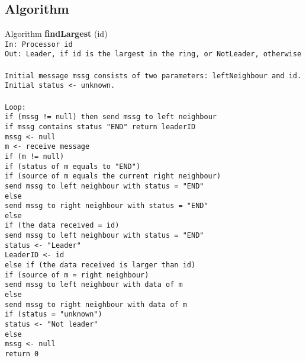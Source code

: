 \documentclass[12pt,letterpaper]{article}
\begin{document}
\subsection* {Algorithm}
Algorithm \textbf{findLargest} (id)\\
\texttt {In: Processor id\\
\texttt Out: Leader, if id is the largest in the ring, or NotLeader, otherwise\\ \\
\texttt Initial message mssg consists of two parameters: leftNeighbour and id. \\
\texttt Initial status <- unknown.\\ \\
\texttt Loop:\\
\texttt if (mssg != null) then send mssg to left neighbour \\ 
\hphantom{~~~~}if mssg contains status "END" return leaderID \\
\texttt mssg <- null \\
\texttt m <- receive message \\
\texttt if (m != null) \\
\hphantom{~~~~} if (status of m equals to "END") \\
\hphantom{~~~~~~~~} if (source of m equals the current right neighbour) \\
\hphantom{~~~~~~~~~~~~} send mssg to left neighbour with status = "END" \\
\hphantom{~~~~~~~~} else \\
\hphantom{~~~~~~~~~~~~} send mssg to right neighbour with status = "END" \\
\hphantom{~~~~} else \\
\hphantom{~~~~~~~~} if (the data received = id) \\
\hphantom{~~~~~~~~~~~~} send mssg to left neighbour with status = "END" \\
\hphantom{~~~~~~~~~~~~} status <- "Leader" \\
\hphantom{~~~~~~~~~~~~} LeaderID <- id \\
\hphantom{~~~~~~~~} else if (the data received is larger than id) \\
\hphantom{~~~~~~~~~~~~} if (source of m = right neighbour) \\
\hphantom{~~~~~~~~~~~~~~~~} send mssg to left neighbour with data of m \\
\hphantom{~~~~~~~~~~~~} else \\
\hphantom{~~~~~~~~~~~~~~~~} send mssg to right neighbour with data of m \\
\hphantom{~~~~~~~~~~~~} if (status = "unknown") \\
\hphantom{~~~~~~~~~~~~~~~~} status <- "Not leader" \\
\hphantom{~~~~~~~~} else \\
\hphantom{~~~~~~~~~~~~} mssg <- null \\
\texttt return 0} \\
\end{document}

